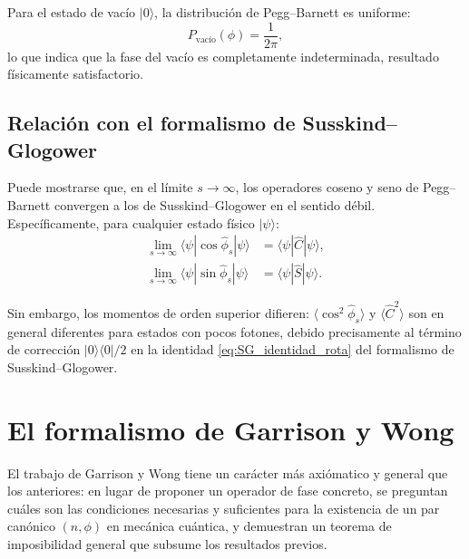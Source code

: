             Para el estado de vacío $|0\rangle$, la distribución de Pegg--Barnett es uniforme:
            \begin{equation}
                P_{\text{vacío}}(\phi) = \frac{1}{2\pi},
            \end{equation}
            lo que indica que la fase del vacío es completamente indeterminada, resultado físicamente satisfactorio.
 
        \subsection{Relación con el formalismo de Susskind--Glogower}
        
            Puede mostrarse que, en el límite $s \to \infty$, los operadores coseno y seno de Pegg--Barnett convergen a los de Susskind--Glogower en el sentido débil. Específicamente, para cualquier estado físico $|\psi\rangle$:
            \begin{align}
                \lim_{s\to\infty}\langle\psi|\cos\hat{\phi}_s|\psi\rangle &= \langle\psi|\hat{C}|\psi\rangle, \\
                \lim_{s\to\infty}\langle\psi|\sin\hat{\phi}_s|\psi\rangle &= \langle\psi|\hat{S}|\psi\rangle.
            \end{align}
            
            Sin embargo, los momentos de orden superior difieren: $\langle\cos^2\hat{\phi}_s\rangle$ y $\langle\hat{C}^2\rangle$ son en general diferentes para estados con pocos fotones, debido precisamente al término de corrección $|0\rangle\langle 0|/2$ en la identidad \eqref{eq:SG_identidad_rota} del formalismo de Susskind--Glogower.
 
    \section{El formalismo de Garrison y Wong}
    
        El trabajo de Garrison y Wong \cite{Garrison1970} tiene un carácter más axiómatico y general que los anteriores: en lugar de proponer un operador de fase concreto, se preguntan cuáles son las condiciones necesarias y suficientes para la existencia de un par canónico $(n, \phi)$ en mecánica cuántica, y demuestran un teorema de imposibilidad general que subsume los resultados previos.
 
